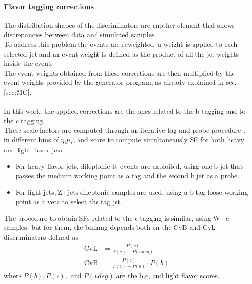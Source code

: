 \paragraph*{Flavor tagging corrections}
The distribution shapes of the \DeepJet discriminators are another element that shows discrepancies between data and simulated samples.\\
To address this problem the events are reweighted:
a weight is applied to each selected jet and an event weight is defined as the product of all the jet weights inside the event.\\
The event weights obtained from these corrections are then multiplied by the event weights provided by the generator program, as already explained in sec. \ref{sec:MC}. 
\\
\\
In this work, the applied corrections are the ones related to the b tagging and to the c tagging.\\
These scale factors are computed through an iterative tag-and-probe procedure \cite{2021B-tagging2018.}, in different bins of $\eta$,$p_T$, and \DeepJet score to compute simultaneously SF for both heavy and light flavor jets.
\begin{itemize}
    \item For heavy-flavor jets, dileptonic ${{\text{t}}{\bar{\text{t}}}}$ events are exploited, using one b jet that passes the medium working point as a tag and the second b jet as a probe.
    \item For light jets, Z+jets dileptonic samples are used, using a b tag loose working point as a veto to select the tag jet.
\end{itemize}
The procedure to obtain SFs related to the c-tagging is similar, using W+c samples, but for them, the binning depends both on the CvB and CvL discriminators defined as
\begin{equation}
\begin{aligned}
     \text{CvL} &= \frac{P(c)}{P(c) + P(udsg)}\\
     \text{CvB} &= \frac{P(c)}{P(c) + P(b)} \cdot P(b) 
\end{aligned}
\end{equation}
where $P(b), P(c),$ and $P(udsg)$ are the b,c, and light flavor \DeepJet scores.



